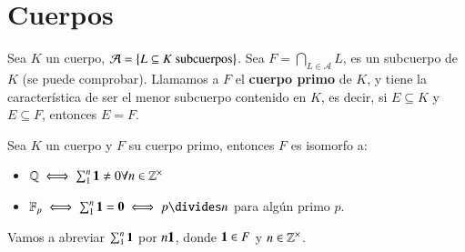 \section{Cuerpos}
\begin{dfn}
    Sea $K$ un cuerpo, $\mathcal{A} = \left\{L \subseteq K \text{ subcuerpos}\right\}$. Sea $F = \bigcap_{L \in \mathcal{A}} L$, es un subcuerpo de $K$ (se puede comprobar). Llamamos a $F$ el \textbf{cuerpo primo} de $K$, y tiene la característica de ser el menor subcuerpo contenido en $K$, es decir, si $E \subseteq K$ y $E \subseteq F$, entonces $E = F$.
\end{dfn}

\begin{thm}
    Sea $K$ un cuerpo y $F$ su cuerpo primo, entonces $F$ es isomorfo a:
    \begin{itemize}
        \item $\mathbb{Q} \iff \sum_1^n \mathbf{1} \neq 0 \forall n \in \mathbb{Z}^\times$
        \item $\F_p \iff \sum_1^n \1 = \0 \iff p \divides n$ para algún primo $p$.
    \end{itemize}
\end{thm}

\begin{obs}
    Vamos a abreviar $\sum_1^n \mathbf{1}$ por $n \mathbf{1}$, donde $\mathbf{1} \in F$ y $n \in \mathbb{Z}^\times$.
\end{obs}

